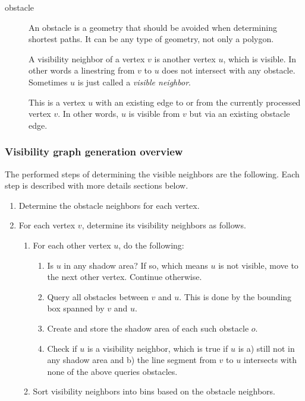 				\begin{description}
					\item[obstacle] An obstacle is a geometry that should be avoided when determining shortest paths. It can be any type of geometry, not only a polygon.
					\item[] A visibility neighbor of a vertex $v$ is another vertex $u$, which is visible. In other words a linestring from $v$ to $u$ does not intersect with any obstacle. Sometimes $u$ is just called a \emph{visible neighbor}.
					\item[] This is a vertex $u$ with an existing edge to or from the currently processed vertex $v$. In other words, $u$ is visible from $v$ but via an existing obstacle edge.
				\end{description}
			
			\subsubsection{Visibility graph generation overview}
			
				The performed steps of determining the visible neighbors are the following.
				Each step is described with more details sections below.
				\begin{enumerate}
					\item Determine the obstacle neighbors for each vertex.
					\item For each vertex $v$, determine its visibility neighbors as follows.
					\begin{enumerate}
						\item For each other vertex $u$, do the following:
						\begin{enumerate}
							\item Is $u$ in any shadow area? If so, which means $u$ is not visible, move to the next other vertex. Continue otherwise.
							\item Query all obstacles between $v$ and $u$. This is done by the bounding box spanned by $v$ and $u$.
							\item Create and store the shadow area of each such obstacle $o$.
							\item Check if $u$ is a visibility neighbor, which is true if $u$ is a) still not in any shadow area and b) the line segment from $v$ to $u$ intersects with none of the above queries obstacles.
						\end{enumerate}
						\item Sort visibility neighbors into bins based on the obstacle neighbors.
					\end{enumerate}
				\end{enumerate}
			
